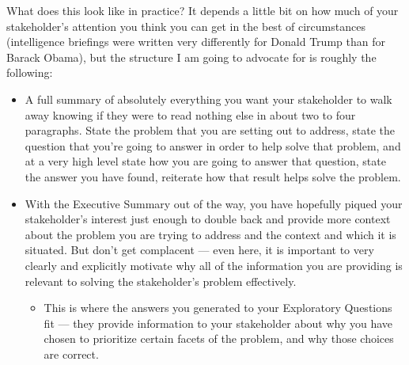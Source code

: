 \documentclass[letterpaper,10pt,english]{jupyterBook}
\begin{document}
\sphinxAtStartPar
What does this look like in practice? It depends a little bit on how much of your stakeholder’s attention you think you can get in the best of circumstances (intelligence briefings were written very differently for Donald Trump than for Barack Obama), but the structure I am going to advocate for is roughly the following:
\begin{itemize}
\item {} 
\sphinxAtStartPar
{} A full summary of absolutely everything you want your stakeholder to walk away knowing if they were to read nothing else in about two to four paragraphs. State the problem that you are setting out to address, state the question that you’re going to answer in order to help solve that problem, and at a very high level state how you are going to answer that question, state the answer you have found, reiterate how that result helps solve the problem.

\item {} 
\sphinxAtStartPar
{} With the Executive Summary out of the way, you have hopefully piqued your stakeholder’s interest just enough to double back and provide  more context about the problem you are trying to address and the context and which it is situated. But don’t get complacent — even here, it is important to very clearly and explicitly motivate why all of the information you are providing is relevant to solving the stakeholder’s problem effectively.
\begin{itemize}
\item {} 
\sphinxAtStartPar
This is where the answers you generated to your Exploratory Questions fit — they provide information to your stakeholder about why you have chosen to prioritize certain facets of the problem, and why those choices are correct.

\end{itemize}


\end{itemize}
\end{document}
